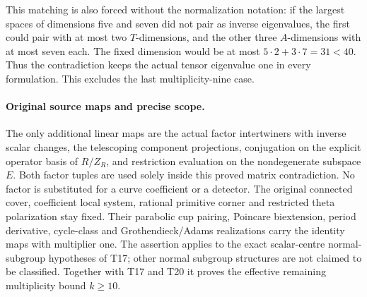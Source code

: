 This matching is also forced without the normalization
notation: if the largest spaces of dimensions five
and seven did not pair as inverse eigenvalues, the
first could pair with at most two \(T\)-dimensions,
and the other three \(A\)-dimensions with at most
seven each. The fixed dimension would be at most
\(5\cdot2+3\cdot7=31<40\).
Thus the contradiction keeps the actual tensor
eigenvalue one in every formulation.
This excludes the last multiplicity-nine case.

\paragraph{Original source maps and precise scope.}
The only additional linear maps are the actual
factor intertwiners with inverse scalar changes,
the telescoping component projections, conjugation
on the explicit operator basis of \(R/Z_R\), and
restriction evaluation on the nondegenerate subspace
\(E\). Both factor tuples are used solely inside
this proved matrix contradiction. No factor is
substituted for a curve coefficient or a detector.
The original connected cover, coefficient local
system, rational primitive corner and restricted
theta polarization stay fixed. Their parabolic
cup pairing, Poincare biextension, period derivative,
cycle-class and Grothendieck/Adams realizations
carry the identity maps with multiplier one.
The assertion applies to the exact scalar-centre
normal-subgroup hypotheses of T17; other normal
subgroup structures are not claimed to be classified.
Together with T17 and T20 it proves the effective
remaining multiplicity bound \(k\ge10\).

